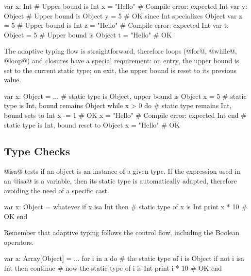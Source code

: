 \begin{lst}
var x: Int # Upper bound is Int
x = "Hello" # Compile error: expected Int
var y: Object # Upper bound is Object
y = 5 # OK since Int specializes Object
var z = 5 # Upper bound is Int
z = "Hello" # Compile error: expected Int
var t: Object = 5 # Upper bound is Object
t = "Hello" # OK
\end{lst}

The adaptive typing flow is straightforward, therefore loops (@for@, @while@, @loop@) and closures have a special requirement: on entry, the upper bound is set to the current static type; on exit, the upper bound is reset to its previous value.

\begin{lst}
var x: Object = ...
# static type is Object, upper bound is Object
x = 5
# static type is Int, bound remains Object
while x > 0 do
 	# static type remains Int, bound sets to Int
	x -= 1 # OK
	x = "Hello" # Compile error: expected Int
end
# static type is Int, bound reset to Object
x = "Hello" # OK
\end{lst}


\subsection{Type Checks}\label{isa}

@isa@ tests if an object is an instance of a given type.
If the expression used in an @isa@ is a variable, then its static type is automatically adapted, therefore avoiding the need of a specific cast.

\begin{lst}
var x: Object = whatever
if x isa Int then
	# static type of x is Int
	print x * 10 # OK
end
\end{lst}

Remember that adaptive typing follows the control flow, including the Boolean operators.

\begin{lst}
var a: Array[Object] = ...
for i in a do
	# the static type of i is Object 
	if not i isa Int then continue
	# now the static type of i is Int
	print i * 10 # OK
end
\end{lst}

